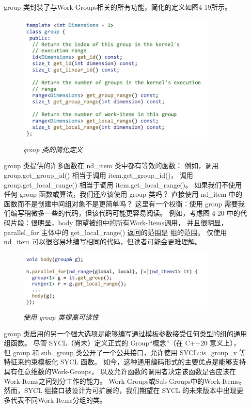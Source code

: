 group 类封装了与Work-Groups相关的所有功能，简化的定义如图4-19所示。

\begin{figure}[H]
	\centering
	\includegraphics[width=0.9\textwidth]{figs/F4.19.png}
	\caption{\textit{group 类的简化定义}}
\end{figure}

group 类提供的许多函数在 nd\_item 类中都有等效的函数：
例如，调用 group.get\_group\_id() 相当于调用 item.get\_group\_id()，
调用 group.get\_local\_range() 相当于调用 item.get\_local\_range()。 
如果我们不使用任何 group 函数或算法，我们还应该使用 group 类吗？ 
直接使用 nd\_item 中的函数而不是创建中间组对象不是更简单吗？ 
这里有一个权衡：使用 group 需要我们编写稍微多一些的代码，但该代码可能更容易阅读。 
例如，考虑图 4-20 中的代码片段：很明显，body 期望被组中的所有Work-Items调用，
并且很明显，parallel\_for 主体中的 get\_local\_range() 返回的范围是 组的范围。 
仅使用 nd\_item 可以很容易地编写相同的代码，但读者可能会更难理解。

\begin{figure}[H]
	\centering
	\includegraphics[width=0.9\textwidth]{figs/F4.20.png}
	\caption{\textit{使用 group 类提高可读性}}
\end{figure}

group 类启用的另一个强大选项是能够编写通过模板参数接受任何类型的组的通用组函数。 
尽管 SYCL（尚未）定义正式的 Group“概念”（在 C++20 意义上），
但 group 和 sub\_group 类公开了一个公共接口，允许使用 SYCL::is\_group\_v 等特征来约束模板化 SYCL 函数。 
如今，这种通用编码形式的主要优点是能够支持具有任意维数的Work-Groups，
以及允许函数的调用者决定该函数是否应该在Work-Items之间划分工作的能力。 Work-Groups或Sub-Groups中的Work-Items。 
然而，SYCL 组接口被设计为可扩展的，我们期望在 SYCL 的未来版本中出现更多代表不同Work-Items分组的类。

